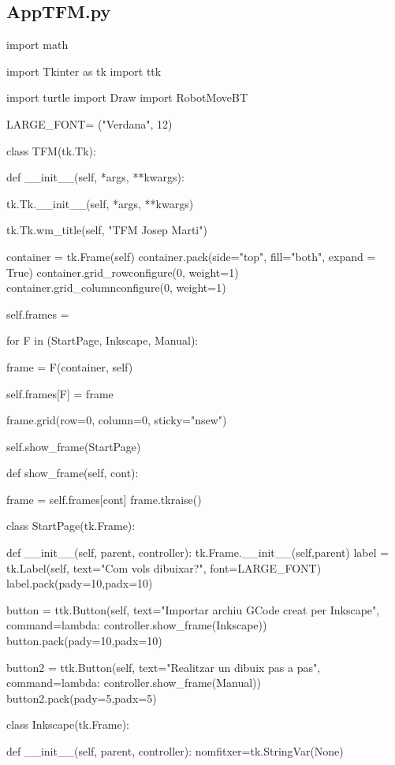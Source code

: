 \newpage

\subsection{AppTFM.py}
\begin{python}
	import math
	
	import Tkinter as tk
	import ttk
	
	import turtle
	import Draw
	import RobotMoveBT
	
	LARGE_FONT= ("Verdana", 12)
	
	
	class TFM(tk.Tk):
	
		def __init__(self, *args, **kwargs):
		
			tk.Tk.__init__(self, *args, **kwargs)
			
			tk.Tk.wm_title(self, "TFM Josep Marti")
			
			
			container = tk.Frame(self)
			container.pack(side="top", fill="both", expand = True)
			container.grid_rowconfigure(0, weight=1)
			container.grid_columnconfigure(0, weight=1)
			
			self.frames = {}
			
			for F in (StartPage, Inkscape, Manual):
			
				frame = F(container, self)
				
				self.frames[F] = frame
				
				frame.grid(row=0, column=0, sticky="nsew")
				
			self.show_frame(StartPage)
		
		def show_frame(self, cont):
		
			frame = self.frames[cont]
			frame.tkraise()
		
	
	class StartPage(tk.Frame):
	
		def __init__(self, parent, controller):
			tk.Frame.__init__(self,parent)
			label = tk.Label(self, text="Com vols dibuixar?", font=LARGE_FONT)
			label.pack(pady=10,padx=10)
			
			button = ttk.Button(self, text="Importar archiu GCode creat per Inkscape",
			command=lambda: controller.show_frame(Inkscape))
			button.pack(pady=10,padx=10)
			
			button2 = ttk.Button(self, text="Realitzar un dibuix pas a pas",
			command=lambda: controller.show_frame(Manual))
			button2.pack(pady=5,padx=5)
	
	
	
	
	class Inkscape(tk.Frame):
	
		def __init__(self, parent, controller):
		nomfitxer=tk.StringVar(None)
		

\end{python}
